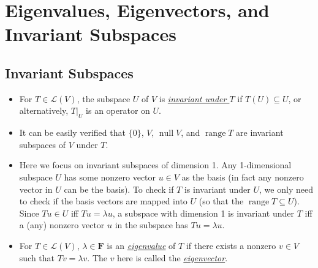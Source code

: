 \documentclass{article}
\newcommand{\df}[1]{\ul{\textit{#1}}}
\newcommand{\F}{\mathbf{F}}
\newcommand{\n}{\operatorname{null}}
\renewcommand{\r}{\operatorname{range}}
\newcommand{\LV}{\mathcal{L}(V)}
\begin{document}
\newpage
\section{Eigenvalues, Eigenvectors, and Invariant Subspaces}
\subsection{Invariant Subspaces}
\begin{itemize}
    \item For $T \in \LV$, the subspace $U$ of $V$ is \df{invariant under $T$} if $T(U) \subseteq U$, or alternatively, $T|_U$ is an operator on $U$.
    \item It can be easily verified that $\{0\}$, $V$, $\n V$, and $\r T$ are invariant subspaces of $V$ under $T$.
    \item Here we focus on invariant subspaces of dimension 1. Any 1-dimensional subspace $U$ has some nonzero vector $u \in V$ as the basis (in fact any nonzero vector in $U$ can be the basis). To check if $T$ is invariant under $U$, we only need to check if the basis vectors are mapped into $U$ (so that the $\r T \subseteq U$). Since $Tu \in U$ iff $Tu = \lambda u$, a subspace with dimension 1 is invariant under $T$ iff a (any) nonzero vector $u$ in the subspace has $Tu = \lambda u$.
    \item For $T \in \LV$, $\lambda \in \F$ is an \df{eigenvalue} of $T$ if there exists a nonzero $v \in V$ such that $Tv = \lambda v$. The $v$ here is called the \df{eigenvector}.
    

\end{itemize}
\end{document}
